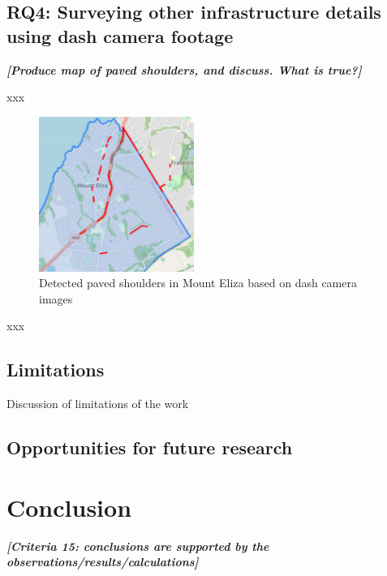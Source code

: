 \documentclass[11pt,twoside]{report}
\newcommand{\remark}[1]{{\bf \em [\marginpar{$\Leftarrow$}#1]}}
\begin{document}
\clearpage
\section{RQ4: Surveying other infrastructure details using dash camera footage}
\label{results:rq4}


\remark{Produce map of paved shoulders, and discuss.  What is true?}

xxx

\begin{figure}[h]
\centering
\includegraphics[width=0.45\textwidth]{map3_1.png}
\caption{Detected paved shoulders in Mount Eliza based on dash camera images}
\label{fig:rq3}
\end{figure}

xxx



\section{Limitations}
\label{results:discussion}



Discussion of limitations of the work


\section{Opportunities for future research}
\label{s:future_work}




\chapter{Conclusion}
\label{conclusion}

\remark{Criteria 15: conclusions are supported by the observations/results/calculations}
\end{document}
